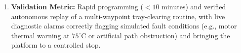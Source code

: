 \begin{enumerate}[leftmargin=1.5em]
  \item \textbf{Validation Metric:} Rapid programming ($<10\text{ minutes}$) and verified autonomous replay of a multi-waypoint tray-clearing routine, with live diagnostic alarms correctly flagging simulated fault conditions (e.g., motor thermal warning at $75^\circ\text{C}$ or artificial path obstruction) and bringing the platform to a controlled stop.
\end{enumerate}
